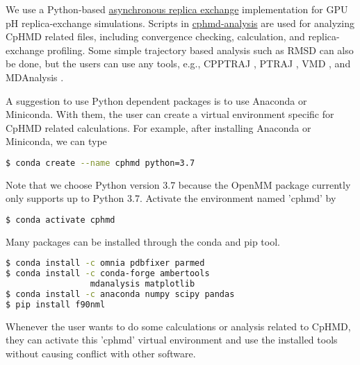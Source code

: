 We use a Python-based \href{https://gitlab.com/shenlab-amber-cphmd/async_ph_replica_exchange}{asynchronous replica exchange} implementation for GPU pH replica-exchange simulations. 
Scripts in \href{https://gitlab.com/shenlab-amber-cphmd/cphmd-analysis}{cphmd-analysis} are used for analyzing CpHMD related files, including convergence checking, {\pka} calculation, and replica-exchange profiling. 
Some simple trajectory based analysis such as RMSD can also be done, but the users can use any tools, e.g., CPPTRAJ \cite{Roe_Thomas_2013_J.Chem.TheoryComput.}, PTRAJ \cite{Roe_Thomas_2013_J.Chem.TheoryComput.}, VMD \cite{Humphrey_Schulten_1996_J.Mol.Graph.}, and MDAnalysis \cite{Michaud-Agrawal_Beckstein_2011_J.Comput.Chem.}. 

A suggestion to use Python dependent packages is to use Anaconda or Miniconda. With them, the user can create a virtual environment specific for CpHMD related calculations. 
For example, after installing Anaconda or Miniconda, we can type 
\begin{lstlisting}[language=bash]
$ conda create --name cphmd python=3.7
\end{lstlisting}
Note that we choose Python version 3.7 because the OpenMM package currently only supports up to Python 3.7. 
Activate the environment named 'cphmd' by
\begin{lstlisting}[language=bash]
$ conda activate cphmd
\end{lstlisting}
Many packages can be installed through the conda and pip tool.
\begin{lstlisting}[language=bash]
$ conda install -c omnia pdbfixer parmed
$ conda install -c conda-forge ambertools
                 mdanalysis matplotlib 
$ conda install -c anaconda numpy scipy pandas 
$ pip install f90nml
\end{lstlisting}
Whenever the user wants to do some calculations or analysis related to CpHMD, they can activate this 'cphmd' virtual environment and use the installed tools without causing conflict with other software. 

